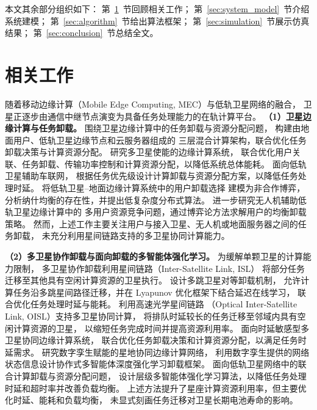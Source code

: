 \documentclass[a4paper,11pt]{article}
\begin{document}
本文其余部分组织如下：
第~\ref{sec:related}~节回顾相关工作；
第~\ref{sec:system_model}~节介绍系统建模；
第~\ref{sec:algorithm}~节给出算法框架；
第~\ref{sec:simulation}~节展示仿真结果；
第~\ref{sec:conclusion}~节总结全文。

\section{相关工作}
\label{sec:related}

随着移动边缘计算（Mobile Edge Computing, MEC）与低轨卫星网络的融合，
卫星正逐步由通信中继节点演变为具备任务处理能力的在轨计算平台。
\noindent\textbf{（1）卫星边缘计算与任务卸载。}
围绕卫星边缘计算中的任务卸载与资源分配问题，
\cite{tang2021hybrid}构建由地面用户、低轨卫星边缘节点和云服务器组成的
三层混合计算架构，联合优化任务卸载决策与计算资源分配。
\cite{ms2024energy}研究多卫星使能的边缘计算系统，
联合优化用户关联、任务卸载、传输功率控制和计算资源分配，以降低系统总体能耗。
\cite{wang2025priority}面向低轨卫星辅助车联网，
根据任务优先级设计计算卸载与资源分配方案，以降低任务处理时延。
\cite{chen2025gdco}将低轨卫星--地面边缘计算系统中的用户卸载选择
建模为非合作博弈，分析纳什均衡的存在性，并提出低复杂度分布式算法。
\cite{chen2025uavgame}进一步研究无人机辅助低轨卫星边缘计算中的
多用户资源竞争问题，通过博弈论方法求解用户的均衡卸载策略。
然而，上述工作主要关注用户与接入卫星、无人机或地面服务器之间的任务卸载，
未充分利用星间链路支持的多卫星协同计算能力。



\noindent\textbf{（2）多卫星协作卸载与面向卸载的多智能体强化学习。}
为缓解单颗卫星的计算能力限制，
多卫星协作卸载利用星间链路（Inter-Satellite Link, ISL）
将部分任务迁移至其他具有空闲计算资源的卫星执行。
\cite{zhang2024mhspo}设计多跳卫星对等卸载机制，
允许计算任务沿多跳星间路径迁移，并在 Lyapunov 优化框架下结合延迟在线学习，
联合优化任务处理时延与能耗。
\cite{zhang2024oisl}利用高速光学星间链路
（Optical Inter-Satellite Link, OISL）支持多卫星协同计算，
将排队时延较长的任务迁移至邻域内具有空闲计算资源的卫星，
以缩短任务完成时间并提高资源利用率。
\cite{li2025dsms}面向时延敏感型多卫星协同边缘计算系统，
联合优化任务卸载决策和计算资源分配，以满足任务时延需求。
\cite{ji2023dtsat}研究数字孪生赋能的星地协同边缘计算网络，
利用数字孪生提供的网络状态信息设计协作式多智能体深度强化学习卸载框架。
\cite{lai2025hmadrl}面向低轨卫星网络中的联合计算卸载与资源分配问题，
设计层级多智能体强化学习算法，以降低任务处理时延和超时率并改善负载均衡。
上述方法提升了星座计算资源利用率，但主要优化时延、能耗和负载均衡，
未显式刻画任务迁移对卫星长期电池寿命的影响。
\end{document}
